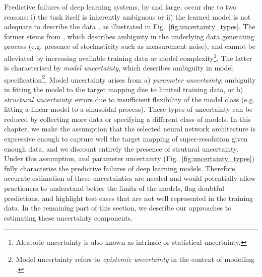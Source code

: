 Predictive failures of deep learning systems, by and large, occur due to two reasons: i) the task itself is inherently ambiguous or ii) the learned model is not adequate to describe the data  \cite{hora1996aleatory,der2009aleatory,tanno2017bayesian,kendall2017uncertainties}, as illustrated in Fig.~\ref{fig:uncertainty_types}. The former stems from  \cite{wang1996intrinsic}, which describes ambiguity in the underlying data generating process  (e.g. presence of stochasticity such as measurement noise), and cannot be alleviated by increasing available training data or model complexity\footnote{Aleatoric uncertainty is also known as intrinsic or statistical uncertainty.}. The latter is characterised by \textit{model uncertainty}\cite{draper1995assessment}, which describes ambiguity in model specification\footnote{Model uncertainty refers to \textit{epistemic uncertainty} in the context of modelling \cite{hora1996aleatory}. }. Model uncertainty arises from a) \textit{parameter uncertainty}: ambiguity in fitting the model to the target mapping due to limited training data, or b) \textit{structural uncertainty}: errors due to insufficient flexibility of the model class (e.g. fitting a linear model to a sinusoidal process). These types of uncertainty can be reduced by collecting more data or specifying a different class of models. In this chapter, we make the assumption that the selected neural network architecture is expressive enough to capture well the target mapping of super-resolution given enough data, and we discount entirely the presence of strutural uncertainty. Under this assumption,  and parameter uncertainty (Fig.~\ref{fig:uncertainty_types}) fully characterise the predictive failures of deep learning models.  Therefore, accurate estimation of these uncertainties are needed and would potentially allow practioners to understand better the limits of the models, flag doubtful predictions, and highlight test cases that are not well represented in the training data. In the remaining part of this section, we describe our approaches to estimating these uncertainty components.



